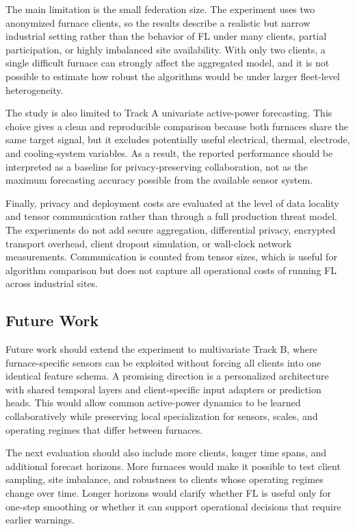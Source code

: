 \documentclass[pdflatex,sn-mathphys-num]{sn-jnl}
\theoremstyle{thmstyleone}%
\theoremstyle{thmstyletwo}%
\theoremstyle{thmstylethree}%
\begin{document}
The main limitation is the small federation size. The experiment uses two anonymized furnace clients, so the results describe a realistic but narrow industrial setting rather than the behavior of FL under many clients, partial participation, or highly imbalanced site availability. With only two clients, a single difficult furnace can strongly affect the aggregated model, and it is not possible to estimate how robust the algorithms would be under larger fleet-level heterogeneity.

The study is also limited to Track A univariate active-power forecasting. This choice gives a clean and reproducible comparison because both furnaces share the same target signal, but it excludes potentially useful electrical, thermal, electrode, and cooling-system variables. As a result, the reported performance should be interpreted as a baseline for privacy-preserving collaboration, not as the maximum forecasting accuracy possible from the available sensor system.

Finally, privacy and deployment costs are evaluated at the level of data locality and tensor communication rather than through a full production threat model. The experiments do not add secure aggregation, differential privacy, encrypted transport overhead, client dropout simulation, or wall-clock network measurements. Communication is counted from tensor sizes, which is useful for algorithm comparison but does not capture all operational costs of running FL across industrial sites.

\subsection{Future Work}\label{sec:future-work}

Future work should extend the experiment to multivariate Track B, where furnace-specific sensors can be exploited without forcing all clients into one identical feature schema. A promising direction is a personalized architecture with shared temporal layers and client-specific input adapters or prediction heads. This would allow common active-power dynamics to be learned collaboratively while preserving local specialization for sensors, scales, and operating regimes that differ between furnaces.

The next evaluation should also include more clients, longer time spans, and additional forecast horizons. More furnaces would make it possible to test client sampling, site imbalance, and robustness to clients whose operating regimes change over time. Longer horizons would clarify whether FL is useful only for one-step smoothing or whether it can support operational decisions that require earlier warnings.
\end{document}
